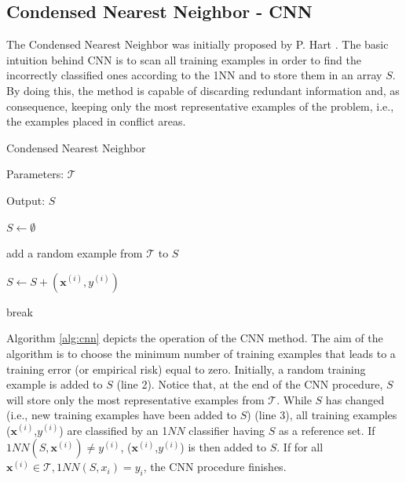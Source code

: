 \subsection{Condensed Nearest Neighbor - CNN}

The Condensed Nearest Neighbor was initially proposed by P. Hart \cite{cnn:68}. The basic intuition behind CNN is to scan all training examples in order to find the incorrectly classified ones according to the 1NN and to store them in an array $S$. By doing this, the method is capable of discarding redundant information and, as consequence, keeping only the most representative examples of the problem, i.e., the examples placed in conflict areas. 


\vspace{0.2cm}

\begin{algorithm}[H]
    \caption{Condensed Nearest Neighbor}
    \label{alg:cnn}
        
    Parameters: $\mathcal{T}$
    
    Output: $S$
    
    \begin{algorithmic}[1] 
    
    \STATE $S \gets \emptyset$
   
    \STATE add a random example from $\mathcal{T}$ to $S$
   
        
    
                
                \STATE $S \gets S + (\mathbf{x}^{(i)}, y^{(i)})$
                
                \STATE break
                    
            \ENDIF
        \ENDFOR
        
    \ENDWHILE
  
  \end{algorithmic}
  
\end{algorithm}

\vspace{0.2cm}

Algorithm \ref{alg:cnn} depicts the operation of the CNN method. The aim of the algorithm is to choose the minimum number of training examples that leads to a training error (or empirical risk) equal to zero. Initially, a random training example is added to $S$ (line 2). Notice that, at the end of the CNN procedure, $S$ will store only the most representative examples from $\mathcal{T}$. While $S$ has changed (i.e., new training examples have been added to $S$) (line 3), all training examples ($\mathbf{x}^{(i)}$,$y^{(i)}$) are classified by an 1$NN$ classifier having $S$ as a reference set. If $1NN(S, \mathbf{x}^{(i)}) \neq y^{(i)}$, ($\mathbf{x}^{(i)}$,$y^{(i)}$) is then added to $S$. If for all $\mathbf{x}^{(i)} \in \mathcal{T}, 1NN(S, x_i) = y_i$, the CNN procedure finishes. 


